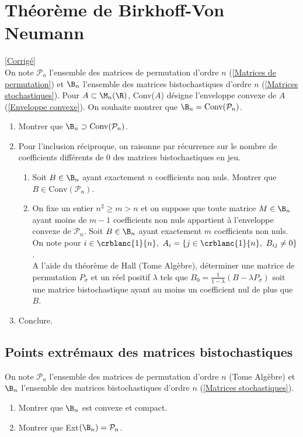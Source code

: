 \documentclass{book}
\begin{document}
\section{Théorème de Birkhoff-Von Neumann }
\label{Théorème de Birkhoff-Von Neumann}
\textcolor{blue}{\hyperref[sec:theoreme-de-birkhoff-von-neumann-etoile4]{[Corrigé]}}\\
On note $\mathcal P_n$ l'ensemble des matrices de permutation d'ordre $n$ (\ref{Matrices de permutation}) et $\B_n$ l'ensemble des matrices bistochastiques d'ordre $n$ (\ref{Matrices stochastiques}). Pour $A\subset \M_n(\R)$, Conv($A$) désigne l'enveloppe convexe de $A$ (\ref{Enveloppe convexe}). On souhaite montrer que $\B_n=\text{Conv}(\mathcal P_n)$.
\begin{enumerate}[leftmargin=*]
	\item Montrer que $\B_n\supset \text{Conv}(\mathcal P_n)$.
	\item Pour l'inclusion réciproque, on raisonne par récurrence sur le nombre de coefficients différents de $0$ des matrices bistochastiques en jeu.
	\begin{enumerate}[label=\alph*.]
		\item Soit $B\in \B_n$ ayant exactement $n$ coefficients non nuls. Montrer que $B\in \text{Conv}(\mathcal P_n)$.
		\item On fixe un entier $n^2\geq m>n$ et on suppose que toute matrice $M\in \B_n$ ayant moins de $m-1$ coefficients non nuls appartient à l'enveloppe convexe de $\mathcal{P}_n$. Soit $B\in \B_n$ ayant exactement $m$ coefficients non nuls. On note pour $i\in \crblanc{1}{n},\ A_i=\{j\in \crblanc{1}{n},\ B_{ij}\ne 0\}$.\\
		A l'aide du théorème de Hall (Tome Algèbre), déterminer une matrice de permutation $P_\sigma$ et un réel positif $\lambda$ tels que $B_0=\displaystyle\frac{1}{1-\lambda}(B-\lambda P_\sigma)$ soit une matrice bistochastique ayant au moins un coefficient nul de plus que $B$.
	\end{enumerate}
	\item Conclure.
\end{enumerate}

\subsection{Points extrémaux des matrices bistochastiques}
On note $\mathcal{P}_n$ l'ensemble des matrices de permutation d'ordre $n$ (Tome Algèbre) et $\B_n$ l'ensemble des matrices bistochastiques d'ordre $n$ (\ref{Matrices stochastiques}).
\begin{enumerate}[leftmargin=*]
	\item Montrer que $\B_n$ est convexe et compact.
	\item Montrer que Ext$(\B_n)=\mathcal{P}_n$.
\end{enumerate}
\end{document}
